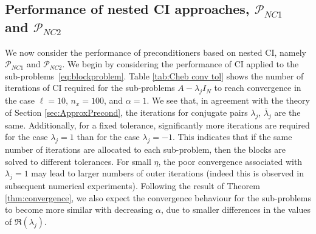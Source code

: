 \documentclass{article}
\newcommand{\sizeA}{N}
\newcommand{\resource}{\eta}
\theoremstyle{definition}
\begin{document}
{{			\subsection{Performance of nested CI approaches, $\mathcal{P}_{NC1}$ and $\mathcal{P}_{NC2}$}\label{sec:NumericsCI}
			
			
			We now consider the performance of preconditioners based on nested CI, namely $\mathcal{P}_{NC1}$ and $\mathcal{P}_{NC2}$. We begin by considering the performance of CI applied to the sub-problems~\eqref{eq:blockproblem}. 
			Table \ref{tab:Cheb conv tol} shows the number of iterations of CI required for the sub-problems $A-\lambda_j I_\sizeA$  to reach convergence in the case $\ell=10$, $n_x=100$, and $\alpha=1$. We see that, in agreement with the theory of Section \ref{sec:ApproxPrecond}, the iterations for conjugate pairs $\lambda_j$, $\overline{\lambda}_j$ are the same. Additionally, for a fixed tolerance, significantly more iterations are required for the case $\lambda_j=1$ than for the case $\lambda_j = -1.$ This indicates that if the same number of iterations are allocated to each sub-problem, then the blocks are solved to different tolerances. For small $\resource$, the poor convergence associated with $\lambda_j=1$ may lead to larger numbers of outer iterations (indeed this is observed in subsequent numerical experiments). 
			Following the result of Theorem \ref{thm:convergence}, we also expect the convergence behaviour for the sub-problems to become more similar with decreasing $\alpha$, due to smaller differences in the values of $\Re(\lambda_j)$.}
		
}
\end{document}
